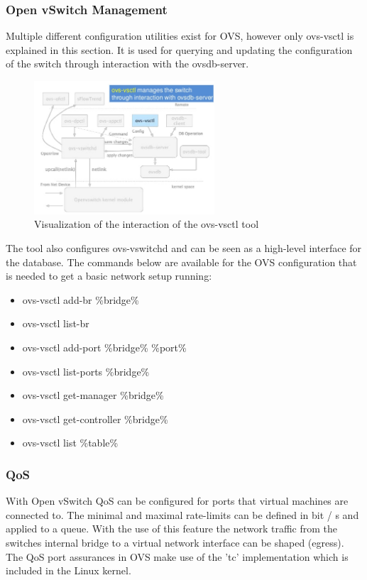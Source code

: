 \subsubsection{Open vSwitch Management}

Multiple different configuration utilities exist for OVS, however only ovs-vsctl is explained in this section. It is used for querying and updating the configuration of the switch through interaction with the ovsdb-server.

\begin{figure}[H]
\centering
\includegraphics[width=0.6\textwidth]{images/fundamentals/openvswitch_vsctl.png}
\caption{Visualization of the interaction of the ovs-vsctl tool}
\end{figure}

The tool also configures ovs-vswitchd and can be seen as a high-level interface for the database.
The commands below are available for the OVS configuration that is needed to get a basic network setup running:
\begin{itemize}
\item ovs-vsctl add-br \%bridge\%
\item ovs-vsctl list-br
\item ovs-vsctl add-port \%bridge\% \%port\%
\item ovs-vsctl list-ports \%bridge\%
\item ovs-vsctl get-manager \%bridge\%
\item ovs-vsctl get-controller \%bridge\%
\item ovs-vsctl list \%table\%
\end{itemize}


\subsubsection{QoS}

With Open vSwitch QoS can be configured for ports that virtual machines are connected to. The minimal and maximal rate-limits can be defined in bit / s and applied to a queue. With the use of this feature the network traffic from the switches internal bridge to a virtual network interface can be shaped (egress). The QoS port assurances in OVS make use of the 'tc' implementation which is included in the Linux kernel.

